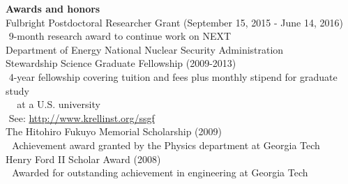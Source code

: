 {\noindent\textbf{Awards and honors}}\\

\indent\hspace{0.2 cm}Fulbright Postdoctoral Researcher Grant (September 15, 2015 - June 14, 2016)\\
\indent\hspace{0.2 cm}\hspace{0.6 cm}\textbullet\,\,9-month research award to continue work on NEXT\\

\indent\hspace{0.2 cm}Department of Energy National Nuclear Security Administration\\
\indent\hspace{0.2 cm}Stewardship Science Graduate Fellowship (2009-2013)\\
\indent\hspace{0.2 cm}\hspace{0.6 cm}\textbullet\,\,4-year fellowship covering tuition and fees plus monthly stipend for graduate study\\
\indent\hspace{0.2 cm}\hspace{0.6 cm}\,\,\,\,\,\,\,at a U.S. university\\
\indent\hspace{0.2 cm}\hspace{0.6 cm}\textbullet\,\,See: \href{http://www.krellinst.org/ssgf}{http://www.krellinst.org/ssgf}\\

\indent\hspace{0.2 cm}The Hitohiro Fukuyo Memorial Scholarship (2009)\\
\indent\hspace{0.2 cm}\hspace{0.6 cm}\textbullet\,\, Achievement award granted by the Physics department at Georgia Tech\\

\indent\hspace{0.2 cm}Henry Ford II Scholar Award (2008)\\ %
\indent\hspace{0.2 cm}\hspace{0.6 cm}\textbullet\,\, Awarded for outstanding achievement in engineering at Georgia Tech\\

